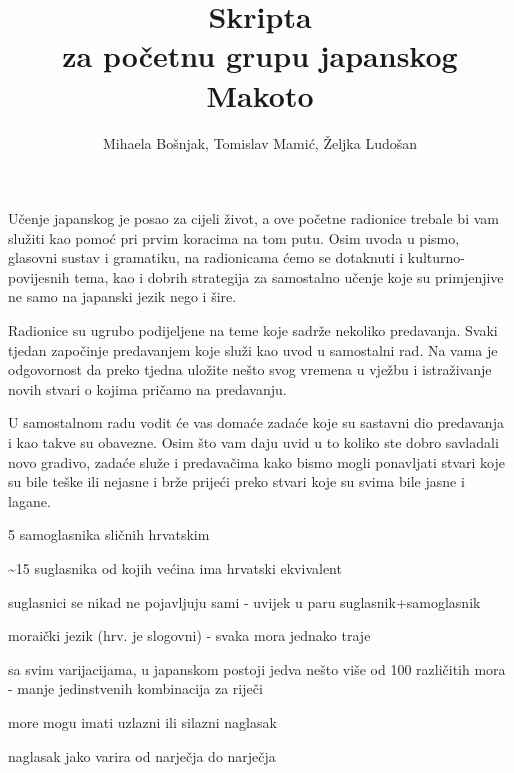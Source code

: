 
\usepackage{graphicx}
\usepackage{caption}
\usepackage{tikz}
\usepackage{xcolor}
\usepackage{wasysym}
\title{Skripta\\
\large za početnu grupu japanskog\\
Makoto}
\author{Mihaela Bošnjak, Tomislav Mamić, Željka Ludošan}



{\let\cleardoublepage\clearpage
\maketitle
\tableofcontents}
\newpage
{}

	
	
	Učenje japanskog je posao za cijeli život, a ove početne radionice trebale bi vam služiti kao pomoć pri prvim koracima na tom putu. Osim uvoda u pismo, glasovni sustav i gramatiku, na radionicama ćemo se dotaknuti i kulturno-povijesnih tema, kao i dobrih strategija za samostalno učenje koje su primjenjive ne samo na japanski jezik nego i šire.
	
	
	Radionice su ugrubo podijeljene na teme koje sadrže nekoliko predavanja. Svaki tjedan započinje predavanjem koje služi kao uvod u samostalni rad. Na vama je odgovornost da preko tjedna uložite nešto svog vremena u vježbu i istraživanje novih stvari o kojima pričamo na predavanju.
	
	
	U samostalnom radu vodit će vas domaće zadaće koje su sastavni dio predavanja i kao takve su obavezne. Osim što vam daju uvid u to koliko ste dobro savladali novo gradivo, zadaće služe i predavačima kako bismo mogli ponavljati stvari koje su bile teške ili nejasne i brže prijeći preko stvari koje su svima bile jasne i lagane.
	
	
	\begin{hyou}
		\item 5 samoglasnika sličnih hrvatskim
		\item \textasciitilde15 suglasnika od kojih većina ima hrvatski ekvivalent
		\item suglasnici se nikad ne pojavljuju sami - uvijek u paru suglasnik+samoglasnik
		\item moraički jezik (hrv. je slogovni) - svaka mora jednako traje
		\item sa svim varijacijama, u japanskom postoji jedva nešto više od 100 različitih mora - manje jedinstvenih kombinacija za riječi
		\item more mogu imati uzlazni ili silazni naglasak
		\item naglasak jako varira od narječja do narječja
	\end{hyou}

